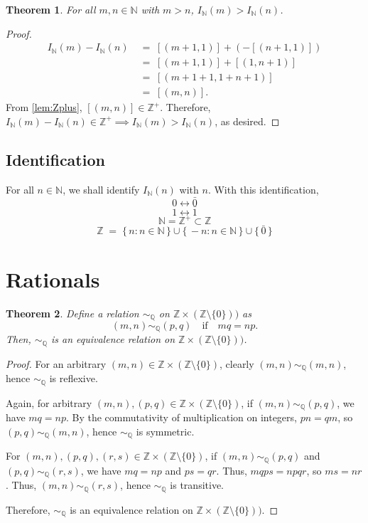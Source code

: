 \documentclass[10pt]{article}
\newtheorem{theorem}{Theorem}[section]
\theoremstyle{definition}
\theoremstyle{remark}
\newcommand{\N}{\mathbb{N}}
\newcommand{\Z}{\mathbb{Z}}
\newcommand{\Q}{\mathbb{Q}}
\newcommand{\Zm}{\Z\times(\Z\setminus\{0\})}
\newcommand{\simQ}{\sim_{\Q}}
\newcommand{\IdN}{I_{\N}}
\begin{document}
        \begin{theorem}
                For all $m, n \in \N$ with $m > n$, $\IdN(m) > \IdN(n)$.
        \end{theorem}
        \begin{proof}
                \begin{align*}
                \IdN(m) - \IdN(n) \;&=\; [(m + 1, 1)] + (-[(n + 1, 1)]) \\
                        \;&=\; [(m + 1, 1)] + [(1, n + 1)] \\
                        \;&=\; [(m + 1 + 1, 1 + n + 1)] \\
                        \;&=\; [(m, n)].
                \end{align*}
                From \ref{lem:Zplus}, $[(m, n)] \in \Z^+$.
                Therefore, $\IdN(m) - \IdN(n) \in \Z^+ \implies \IdN(m) > \IdN(n)$, as desired.
        \end{proof}

        \subsection*{Identification}
        For all $n \in \N$, we shall identify $\IdN(n)$ with $n$.
        With this identification,
        \[0 \leftrightarrow \bar{0}\]
        \[1 \leftrightarrow \bar{1}\]
        \[\N = \Z^+ \subset \Z\]
        \[
        \Z \;=\; \{\,n : n \in \N\,\} \cup
                \{\,-n : n \in \N\,\} \cup
                \{\,\bar{0}\,\}
        \]
        
        \section{Rationals}
        \begin{theorem}
        Define a relation $\simQ$ on $\Zm)$ as
        \[(m, n) \simQ (p, q) \quad\text{if}\quad mq = np. \]
        Then, $\simQ$ is an equivalence relation on $\Zm)$.
        \end{theorem}
        \begin{proof}
                For an arbitrary $(m, n) \in \Zm$, clearly $(m, n) \simQ (m, n)$, hence $\simQ $ is reflexive.

                Again, for arbitrary $(m, n), (p, q) \in \Zm$, if
                $(m, n) \simQ (p, q)$, we have $mq = np$.
                By the commutativity of multiplication on integers, $pn = qm$, so 
                $(p, q) \simQ (m, n) $, hence $\simQ$ is symmetric.

                For $(m, n), (p, q), (r, s) \in \Zm$, if
                $(m, n) \simQ (p, q)$ and $(p, q) \simQ (r, s)$, we have
                $mq = np$ and $ps = qr$. Thus, 
                $mqps = npqr$, so $ms = nr$.
                Thus, $(m, n) \simQ (r, s)$, hence $\simQ$ is transitive.

                Therefore, $\simQ$ is an equivalence relation on $\Zm)$.
        \end{proof}
\end{document}
